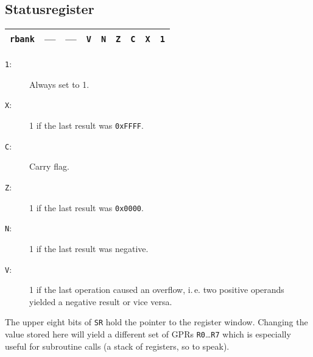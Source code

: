\documentclass{leaflet}
\begin{document}
  \subsection{Statusregister}
   \begin{center}
    \begin{longtable}{|c||c|c|c|c|c|c|c|c|}
     \hline
     {\tt rbank}&
     ---&---&{\tt V}&{\tt N}&{\tt Z}&{\tt C}&{\tt X}&{\tt 1}\\
     \hline
    \end{longtable}
    \vspace*{-9mm}
   \end{center}
   \begin{description}
    \item [{\tt 1}:] Always set to 1.
    \item [{\tt X}:] 1 if the last result was {\tt 0xFFFF}.
    \item [{\tt C}:] Carry flag.
    \item [{\tt Z}:] 1 if the last result was {\tt 0x0000}.
    \item [{\tt N}:] 1 if the last result was negative.
    \item [{\tt V}:] 1 if the last operation caused an overflow, i.\,e. two
     positive operands yielded a negative result or vice versa.
   \end{description}
   The upper eight bits of \texttt{SR} hold the pointer to the register
   window. Changing the value stored here will yield a different set of 
   GPRs \texttt{R0}\dots\texttt{R7} which is especially useful for subroutine
   calls (a stack of registers, so to speak).
   \vspace*{-5mm}
%
\end{document}
